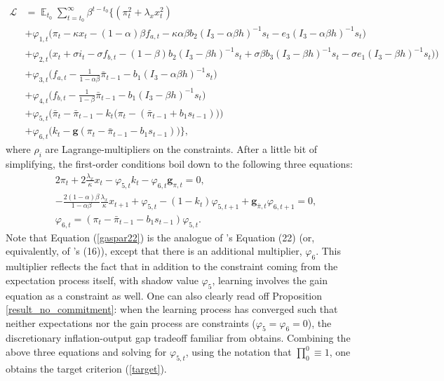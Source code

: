 \documentclass[11pt]{article}
\renewcommand{\[}{\begin{equation}}
\renewcommand{\]}{\end{equation}}
\DeclareMathOperator{\E}{\mathbb{E}}
\begin{document}
 \begin{align}
\mathcal{L} &= \E_{t_0}\sum_{t=t_0}^{\infty} \beta^{t-t_0}\bigg\{  (\pi_t^2  + \lambda_x x_t^2 )  \\
 & + \varphi_{1,t} \bigg(\pi_t - \kappa x_t -(1-\alpha)\beta f_{a,t} -\kappa\alpha\beta b_2 (I_3 - \alpha\beta h)^{-1}s_t - e_3(I_3 - \alpha\beta h)^{-1}s_t \bigg) \label{midsimple_first}\\
 & + \varphi_{2,t} \bigg(x_t + \sigma i_t -\sigma f_{b,t}  -  (1-\beta)b_2 (I_3 - \beta h)^{-1}s_t + \sigma\beta b_3 (I_3 - \beta h)^{-1}s_t -\sigma e_1(I_3 - \beta h)^{-1}s_t  \big)\bigg) \\
 & +  \varphi_{3,t}  \bigg(f_{a,t} - \frac{1}{1-\alpha\beta}\bar{\pi}_{t-1}  - b_1(I_3 - \alpha\beta h)^{-1}s_t  \bigg) \\
 & + \varphi_{4,t}  \bigg(f_{b,t} - \frac{1}{1-\beta}\bar{\pi}_{t-1}  - b_1(I_3 - \beta h)^{-1}s_t \bigg)  \\
  & + \varphi_{5,t}  \bigg(  \bar{\pi}_{t} - \bar{\pi}_{t-1} - k_t\big(\pi_{t} -(\bar{\pi}_{t-1}+b_1 s_{t-1}) \big)   \bigg)  \\
  & + \varphi_{6,t}  \bigg(k_t - \mathbf{g}(\pi_t - \bar{\pi}_{t-1}-b_1 s_{t-1})  \bigg)
  \bigg\} \label{midsimple_last},
\end{align}
where $\rho_i$ are Lagrange-multipliers on the constraints.
After a little bit of simplifying, the first-order conditions boil down to the following three equations:
\begin{align}
& 2\pi_t + 2\frac{\lambda_x}{\kappa}x_t -\varphi_{5,t} k_t - \varphi_{6,t} \mathbf{g}_{\pi,t} = 0 \label{gaspar22},\\
& -\frac{2(1-\alpha)\beta}{1-\alpha\beta}\frac{\lambda_x}{\kappa}x_{t+1} + \varphi_{5,t} -(1-k_t)\varphi_{5,t+1} +\mathbf{g}_{\bar{\pi},t}\varphi_{6,t+1} = 0 ,\label{gaspar21}\\
& \varphi_{6,t} = (\pi_t - \bar{\pi}_{t-1}-b_1 s_{t-1}) \varphi_{5,t}. \label{constraints}
\end{align}
Note that Equation (\ref{gaspar22}) is the analogue of \cite{gaspar2010inflation}'s Equation (22) (or, equivalently, of  \cite{molnar2014optimal}'s (16)), except that there is an additional multiplier, $\varphi_6$. This multiplier reflects the fact that in addition to the constraint coming from the expectation process itself, with shadow value $\varphi_5$, learning involves the gain equation as a constraint as well. One can also clearly read off Proposition \ref{result_no_commitment}: when the learning process has converged such that neither expectations nor the gain process are constraints ($\varphi_5 =\varphi_6 = 0$), the discretionary inflation-output gap tradeoff familiar from \cite{clarida1999science} obtains. Combining the above three equations and solving for $\varphi_{5,t}$, using the notation that $\prod_{0}^{0} \equiv 1$, one obtains the target criterion (\ref{target}).
\end{document}
